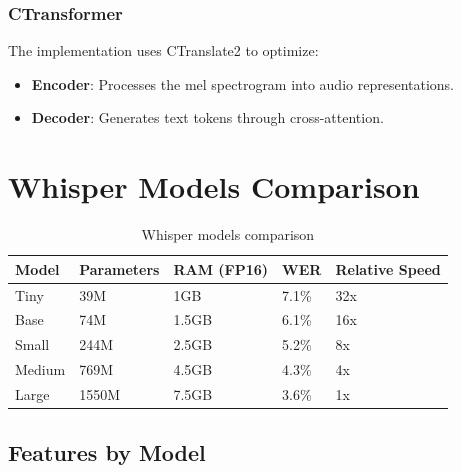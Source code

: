 \subsubsection{CTransformer}
The implementation uses CTranslate2 to optimize:
\begin{itemize}
	\item \textbf{Encoder}: Processes the mel spectrogram into audio representations.
	\item \textbf{Decoder}: Generates text tokens through cross-attention.
\end{itemize}

\section{Whisper Models Comparison}
\label{sec:whisper-models-comparison}

\begin{table}[H]
	\label{tab:whisper-models}
	\begin{tabular}{|p{2cm}|p{2cm}|p{3cm}|p{3cm}|p{3cm}|}
		\hline
		\textbf{Model} & \textbf{Parameters} & \textbf{RAM (FP16)} & \textbf{WER} & \textbf{Relative Speed} \\
		\hline
		Tiny            & 39M                 & 1GB                 & 7.1\%        & 32x                         \\
		\hline
		Base            & 74M                 & 1.5GB               & 6.1\%        & 16x                         \\
		\hline
		Small           & 244M                & 2.5GB               & 5.2\%        & 8x                          \\
		\hline
		Medium          & 769M                & 4.5GB               & 4.3\%        & 4x                          \\
		\hline
		Large           & 1550M               & 7.5GB               & 3.6\%        & 1x                          \\
		\hline
	\end{tabular}
	\caption{Whisper models comparison}
\end{table}

\subsection{Features by Model}
\label{subsec:model-features}

